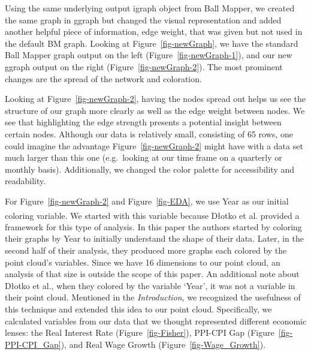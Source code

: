 \documentclass[10pt, letterpaper]{article}
\begin{document}
Using the same underlying output igraph object from Ball Mapper, we
created the same graph in ggraph but changed the visual representation
and added another helpful piece of information, edge weight, that was
given but not used in the default BM graph. Looking at
Figure~\ref{fig-newGraph}, we have the standard Ball Mapper graph output
on the left (Figure~\ref{fig-newGraph-1}), and our new ggraph output on
the right (Figure~\ref{fig-newGraph-2}). The most prominent changes are
the spread of the network and coloration.

Looking at Figure~\ref{fig-newGraph-2}, having the nodes spread out
helps us see the structure of our graph more clearly as well as the edge
weight between nodes. We see that highlighting the edge strength
presents a potential insight between certain nodes. Although our data is
relatively small, consisting of 65 rows, one could imagine the advantage
Figure~\ref{fig-newGraph-2} might have with a data set much larger than
this one (e.g.~looking at our time frame on a quarterly or monthly
basis). Additionally, we changed the color palette for accessibility and
readability.

For Figure~\ref{fig-newGraph-2} and Figure~\ref{fig-EDA}, we use Year as
our initial coloring variable. We started with this variable because
D\l{}otko et
al.\textsuperscript{}
provided a framework for this type of analysis. In this paper the
authors started by coloring their graphs by Year to initially understand
the shape of their data. Later, in the second half of their analysis,
they produced more graphs each colored by the point cloud's variables.
Since we have 16 dimensions to our point cloud, an analysis of that size
is outside the scope of this paper. An additional note about D\l{}otko
et al., when they colored by the variable `Year', it was not a variable
in their point cloud. Mentioned in the \emph{Introduction}, we
recognized the usefulness of this technique and extended this idea to
our point cloud. Specifically, we calculated variables from our data
that we thought represented different economic lenses: the Real Interest
Rate (Figure~\ref{fig-Fisher}), PPI-CPI Gap
(Figure~\ref{fig-PPI-CPI_Gap}), and Real Wage Growth
(Figure~\ref{fig-Wage_Growth}).
\end{document}
